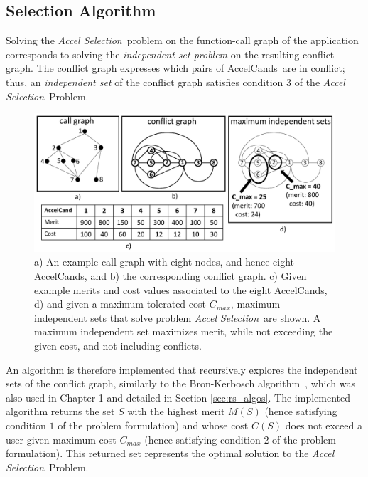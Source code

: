 \documentclass[]{usiinfthesis}
\newcommand{\candidates}{{AccelCand}s}
\newcommand{\asprobname}{\emph{Accel Selection}}
\begin{document}
\subsection{Selection Algorithm}
\label{sec:algo}

Solving the \asprobname\ problem on the function-call graph of the
application corresponds to solving the \emph{independent set problem} on 
the resulting conflict graph. The conflict graph expresses which pairs of 
\candidates\ are in conflict; thus, an \emph{independent set} of the conflict 
graph satisfies condition $3$ of the \asprobname\ Problem.\par

\begin{figure}[!t]
  \centering
  \includegraphics[width=0.8\linewidth]{figs/max_set_examples.pdf}
  \caption{a) An example call graph with eight nodes, and hence
          eight \candidates, and b) the corresponding conflict graph.
          c) Given example merits and cost values associated to the eight
          \candidates, d) and given a maximum tolerated cost
          $C_{max}$, maximum independent sets that solve problem
          \asprobname\ are shown. A maximum independent set maximizes
          merit, while not exceeding the given cost, and not including
          conflicts.}
  \label{fig:max-set-examples}
\end{figure}

An algorithm is therefore implemented that recursively explores the
independent sets of the conflict graph, similarly to the Bron-Kerbosch
algorithm~\cite{BronKerbosch73}, which was also used in Chapter 1 and 
detailed in Section \ref{sec:rs_algos}. The implemented algorithm 
returns the set $S$ with the
highest merit $M(S)$ (hence satisfying condition $1$ of the problem
formulation) and whose cost $C(S)$ does not exceed a user-given
maximum cost $C_{max}$ (hence satisfying condition $2$ of the
problem formulation). This returned set represents the optimal
solution to the \asprobname\ Problem.\par
\end{document}

